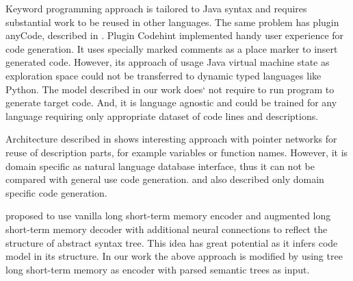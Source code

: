 Keyword programming approach \parencite{little2009keyword} is tailored to Java syntax and requires substantial work to be reused in other languages. The same problem has plugin anyCode, described in \cite{Gvero2015}. Plugin Codehint \parencite{Galenson2014} implemented handy user experience for code generation. It uses specially marked comments as a place marker to insert generated code. However, its approach of usage Java virtual machine state as exploration space could not be transferred to dynamic typed languages like Python. The model described in our work does` not require to run program to generate target code. And, it is language agnostic and could be trained for any language requiring only appropriate dataset of code lines and descriptions.

Architecture described in \cite{Zhong2017} shows interesting approach with pointer networks for reuse of description parts, for example variables or function names. However, it is domain specific as natural language database interface, thus it can not be compared with general use code generation. \cite{Chen2016} and \cite{Ling2016} also described only domain specific code generation.

\cite{Yin2017} proposed to use vanilla long short-term memory encoder and augmented long short-term memory decoder with additional neural connections to reflect the structure of abstract syntax tree. This idea has great potential as it infers code model in its structure. In our work the above approach is modified by using tree long short-term memory as encoder with parsed semantic trees as input.

